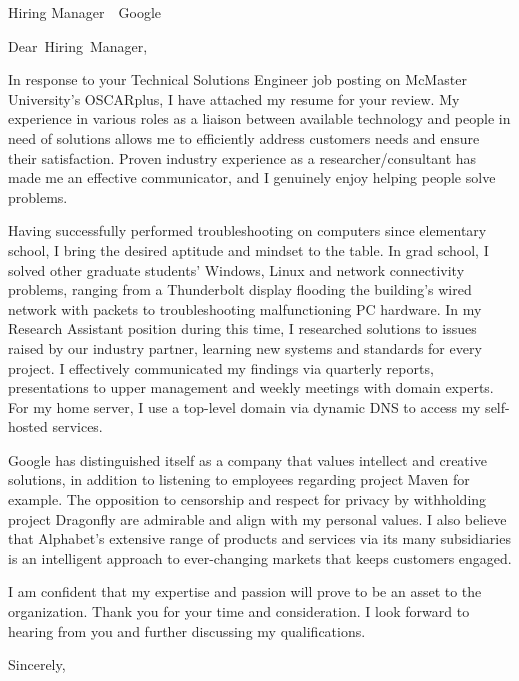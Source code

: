 \documentclass[
fontsize=12pt,
paper=letter,
parskip=half,
enlargefirstpage=on,    %
fromalign=right,        %
fromphone=on,           %
fromemail=on,
fromrule=aftername,     %
addrfield=off,           %
backaddress=off,         %
subject=beforeopening,  %
locfield=narrow,        %
foldmarks=off,           %
]{scrlttr2}
\renewcommand{\\}{\ {\large\textperiodcentered}\ }
\begin{document}

\begin{letter}{Hiring Manager\\Google}


\opening{Dear~Hiring~Manager,}

In response to your Technical Solutions Engineer job posting on McMaster University's OSCARplus, I have attached my resume for your review.
My experience in various roles as a liaison between available technology and people in need of solutions allows me to efficiently address customers needs and ensure their satisfaction.
Proven industry experience as a researcher/consultant has made me an effective communicator, and I genuinely enjoy helping people solve problems.

Having successfully performed troubleshooting on computers since elementary school, I bring the desired aptitude and mindset to the table.
In grad school, I solved other graduate students' Windows, Linux and network connectivity problems, ranging from a Thunderbolt display flooding the building's wired network with packets to troubleshooting malfunctioning PC hardware.
In my Research Assistant position during this time, I researched solutions to issues raised by our industry partner, learning new systems and standards for every project.
I effectively communicated my findings via quarterly reports, presentations to upper management and weekly meetings with domain experts.
For my home server, I use a top-level domain via dynamic DNS to access my self-hosted services.

Google has distinguished itself as a company that values intellect and creative solutions, in addition to listening to employees regarding project Maven for example.
The opposition to censorship and respect for privacy by withholding project Dragonfly are admirable and align with my personal values.
I also believe that Alphabet's extensive range of products and services via its many subsidiaries is an intelligent approach to ever-changing markets that keeps customers engaged.

I am confident that my expertise and passion will prove to be an asset to the organization.
Thank you for your time and consideration.
I look forward to hearing from you and further discussing my qualifications.
\closing{Sincerely,}


\end{letter}
\end{document}
